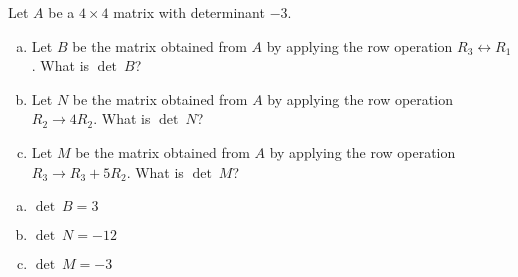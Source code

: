 
\begin{exerciseStatement}


Let \(A\) be a \(4 \times 4\) matrix with determinant \( -3 \).


\begin{enumerate}[(a)]
\item Let \(B\) be the matrix obtained from \(A\) by applying the row operation \( R_3 \leftrightarrow R_1 \). What is \(\operatorname{det}\ B\)?
\item Let \(N\) be the matrix obtained from \(A\) by applying the row operation \( R_2 \to 4R_2 \). What is \(\operatorname{det}\ N\)?
\item Let \(M\) be the matrix obtained from \(A\) by applying the row operation \( R_3 \to R_3 + 5R_2 \). What is \(\operatorname{det}\ M\)?
\end{enumerate}
    
\end{exerciseStatement}
    
\begin{exerciseAnswer} 

\begin{enumerate}[(a)]
\item \(\operatorname{det}\ B= 3 \)
\item \(\operatorname{det}\ N= -12 \)
\item \(\operatorname{det}\ M= -3 \)
\end{enumerate}
    
\end{exerciseAnswer}
    
